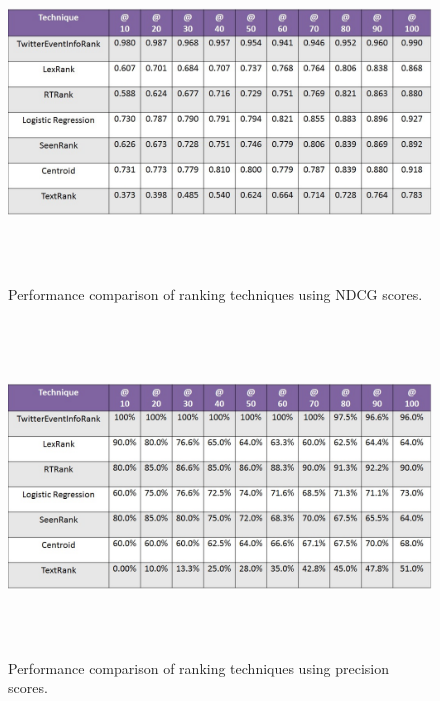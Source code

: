 \begin{figure}[htbp]
\centering
\includegraphics[height=3.5in,width=5.5in]{Figures/sydneysiegendcg.jpg}
\caption{\small Performance comparison of ranking techniques using NDCG scores.}
\label{sydneysiegendcg}
\end{figure}

\begin{figure}[htbp]
\centering
\includegraphics[height=3.5in,width=5.5in]{Figures/millionsmarchnycprecision.jpg}
\caption{\small Performance comparison of ranking techniques using precision scores.}
\label{millionsmarchnycprecision}
\end{figure}

